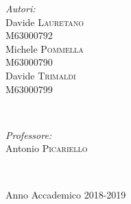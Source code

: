 \documentclass[a4paper,12pt]{report}
\begin{document}
\begin{titlepage}
		
		\vspace{-1.5cm}
		\begin{minipage}{0.4\textwidth}
			\begin{flushleft} \large
				\emph{Autori:}\\
				Davide  \textsc{Lauretano \\}\textsc{M63000792}\\ Michele  \textsc{Pommella} \\ \textsc{M63000790}\\Davide  \textsc{Trimaldi \\}\textsc{M63000799}
			\end{flushleft}
		\end{minipage}
		~
		\begin{minipage}{0.4\textwidth}
			\begin{flushright} \large
				\emph{Professore:} \\
				Antonio  \textsc{Picariello \\}
			\end{flushright}
		\end{minipage}\\
		\begin{center}
			\vfill
			{\sc Anno Accademico 2018-2019}
		\end{center}
	\end{titlepage}
	
	
	
	\tableofcontents
	\listoffigures
	\listoftables
	
	
	
	
	
	
\end{document}
